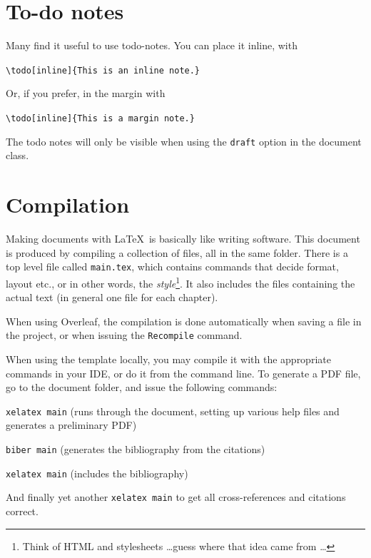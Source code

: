     
\section{To-do notes}
\label{sec:miscellaneous}

Many find it useful to use todo-notes. You can place it inline, with

\verb|\todo[inline]{This is an inline note.}|

Or, if you prefer, in the margin with 

\verb|\todo[inline]{This is a margin note.}|

 The todo notes will only be visible when using the \texttt{draft} option in the document class.

\section{Compilation}


Making documents with \LaTeX\ is basically like writing software. 
This document is produced by compiling a collection of files, all in the same folder.
There is a top level file called 
\texttt{main.tex}, which contains commands that decide format, layout etc., or in other words, the {\em style}\footnote{Think of HTML and stylesheets \dots guess where that idea came from \dots}. It also includes the files containing the actual text (in general one file for each chapter).

When using Overleaf, the compilation is done automatically when saving a file in the project, or when issuing the \texttt{Recompile} command.


When using the template locally, you may compile it with the appropriate commands in your IDE, or do it from the command line. To generate a PDF file, go to the document folder, and issue the following commands: 

\begin{compactenum}
\item \verb|xelatex main| (runs through the document, setting up various help files and generates a preliminary PDF)
\item \verb|biber main| (generates the bibliography from the citations)
\item \verb|xelatex main| (includes the bibliography)
\item And finally yet another \verb|xelatex main| to get all cross-references and citations correct.
\end{compactenum}


